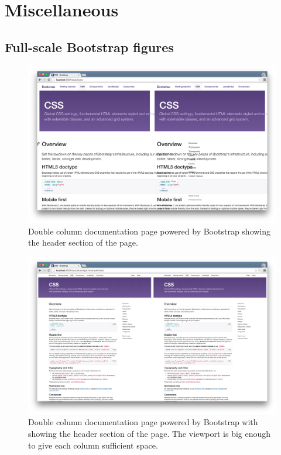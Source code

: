 \documentclass[a4paper,11pt]{kth-mag}
\begin{document}

  \printbibliography
  \clearpage
  \printnoidxglossary[sort=standard, type=main]
  \printnoidxglossary[sort=standard, type=\acronymtype]
  \appendix
  \addappheadtotoc
    
    \chapter{Miscellaneous}
      \section{Full-scale Bootstrap figures}
        \begin{figure}[htbp!]
          \centering
          \includegraphics[width=0.9\linewidth]{images/bootstrap-mq-header-small}
          \caption{Double column documentation page powered by \gls{Bootstrap} showing the header section of the page.}
          \label{fig:appendix-bootstrap-mq-header-small}
        \end{figure}
        \begin{figure}[htbp!]
          \centering
          \includegraphics[width=0.9\linewidth]{images/bootstrap-mq-header-big}
          \caption{Double column documentation page powered by \gls{Bootstrap} with showing the header section of the page. The \gls{viewport} is big enough to give each column sufficient space.}
          \label{fig:appendix-bootstrap-mq-header-big}
        \end{figure}
\end{document}
